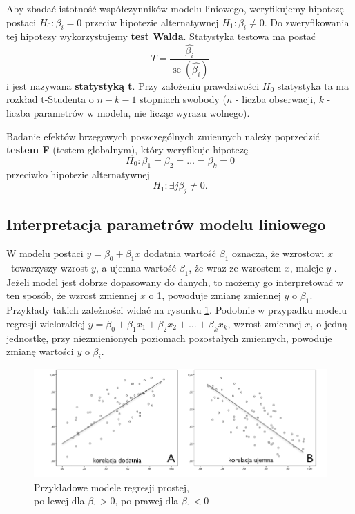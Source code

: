 \documentclass[12pt]{mwbk}
\theoremstyle{plain}
\theoremstyle{definition}
\theoremstyle{definition}
\newcommand\zrodlo[1]{\par\vspace{-3mm}{\small\textit{Źródło: }#1 }}
\begin{document}
Aby zbadać istotność współczynników modelu liniowego, weryfikujemy hipotezę postaci $H_0: \beta_i = 0$ przeciw hipotezie alternatywnej $H_1: \beta_i \neq 0.																																																																																																																																																																																																																																																																																																																																																																																																																																																																																																																													$ Do zweryfikowania tej hipotezy wykorzystujemy \textbf{test Walda}. Statystyka testowa ma postać $$T=\frac{\hat{\beta_i}}{\operatorname{se}(\hat{\beta_i})}$$ i jest nazywana \textbf{statystyką t}. Przy założeniu prawdziwości $H_0$ statystyka ta ma rozkład t-Studenta o $n-k-1$ stopniach swobody ($n$ - liczba obserwacji, $k$ - liczba parametrów w modelu, nie licząc wyrazu wolnego).

Badanie efektów brzegowych poszczególnych zmiennych należy poprzedzić \textbf{testem F} (testem globalnym), który weryfikuje hipotezę $$H_0: \beta_1=\beta_2=\ldots=\beta_k=0$$
 przeciwko hipotezie alternatywnej $$H_1: \exists{j} \beta_j \neq 0.$$

\subsection{Interpretacja parametrów modelu liniowego}

W modelu postaci $y=\beta_0 +\beta_1 x$ dodatnia wartość $\beta_1$ oznacza, że wzrostowi $x$~towarzyszy wzrost $y$, a ujemna wartość $\beta_1$, że wraz ze wzrostem $x$, maleje $y$ \cite{rozrzut}. Jeżeli model jest dobrze dopasowany do danych, to możemy go interpretować w ten sposób, że wzrost zmiennej $x$ o 1, powoduje zmianę zmiennej $y$ o $\beta_1$. Przykłady takich zależności widać na rysunku \ref{fig:regresje}. Podobnie w przypadku modelu regresji wielorakiej
$y=\beta_0+\beta_1 x_1+\beta_2 x_2 + \ldots + \beta_k x_k$, wzrost zmiennej $x_i$ o jedną jednostkę, przy niezmienionych poziomach pozostałych zmiennych, powoduje zmianę wartości $y$ o $\beta_i$.

\begin{figure}[!h]
	\centering
	\includegraphics[width=\linewidth]{rys/wykres-rozrzutu.png}
	\caption{Przykładowe modele regresji prostej, \\po lewej dla $\beta_1>0$, po prawej dla $\beta_1<0$}
	\label{fig:regresje}
	\zrodlo{\cite{wykres}}
\end{figure}
\end{document}
